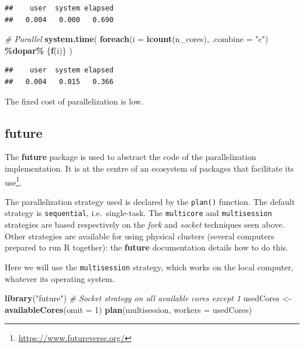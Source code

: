 \documentclass[
  12pt,
  american,
  a4paper,
  extrafontsizes,onecolumn,openright
  ]{memoir}
\newenvironment{Shaded}{\begin{snugshade}}{\end{snugshade}}
\newcommand{\AttributeTok}[1]{\textcolor[rgb]{0.13,0.29,0.53}{#1}}
\newcommand{\CommentTok}[1]{\textcolor[rgb]{0.56,0.35,0.01}{\textit{#1}}}
\newcommand{\DecValTok}[1]{\textcolor[rgb]{0.00,0.00,0.81}{#1}}
\newcommand{\FunctionTok}[1]{\textcolor[rgb]{0.13,0.29,0.53}{\textbf{#1}}}
\newcommand{\NormalTok}[1]{#1}
\newcommand{\OtherTok}[1]{\textcolor[rgb]{0.56,0.35,0.01}{#1}}
\newcommand{\SpecialCharTok}[1]{\textcolor[rgb]{0.81,0.36,0.00}{\textbf{#1}}}
\newcommand{\StringTok}[1]{\textcolor[rgb]{0.31,0.60,0.02}{#1}}
\begin{document}
\begin{verbatim}
##    user  system elapsed 
##   0.004   0.000   0.690
\end{verbatim}

\begin{Shaded}
\begin{Highlighting}[]
\CommentTok{\# Parallel}
\FunctionTok{system.time}\NormalTok{(}
  \FunctionTok{foreach}\NormalTok{(}\AttributeTok{i =} \FunctionTok{icount}\NormalTok{(n\_cores), }\AttributeTok{.combine =} \StringTok{"c"}\NormalTok{) }\SpecialCharTok{\%dopar\%}\NormalTok{ \{}\FunctionTok{f}\NormalTok{(i)\}}
\NormalTok{)}
\end{Highlighting}
\end{Shaded}

\begin{verbatim}
##    user  system elapsed 
##   0.004   0.015   0.366
\end{verbatim}

\normalsize

The fixed cost of parallelization is low.

\subsection{future}\label{future}

The \textbf{future} package is used to abstract the code of the parallelization implementation.
It is at the centre of an ecosystem of packages that facilitate its use\footnote{\url{https://www.futureverse.org/}}.

The parallelization strategy used is declared by the \texttt{plan()} function.
The default strategy is \texttt{sequential}, i.e.~single-task.
The \texttt{multicore} and \texttt{multisession} strategies are based respectively on the \emph{fork} and \emph{socket} techniques seen above.
Other strategies are available for using physical clusters (several computers prepared to run R together): the \textbf{future} documentation details how to do this.

Here we will use the \texttt{multisession} strategy, which works on the local computer, whatever its operating system.

\scriptsize

\begin{Shaded}
\begin{Highlighting}[]
\FunctionTok{library}\NormalTok{(}\StringTok{"future"}\NormalTok{)}
\CommentTok{\# Socket strategy on all available cores except 1}
\NormalTok{usedCores }\OtherTok{\textless{}{-}} \FunctionTok{availableCores}\NormalTok{(}\AttributeTok{omit =} \DecValTok{1}\NormalTok{)}
\FunctionTok{plan}\NormalTok{(multisession, }\AttributeTok{workers =}\NormalTok{ usedCores)}
\end{Highlighting}
\end{Shaded}
\end{document}
